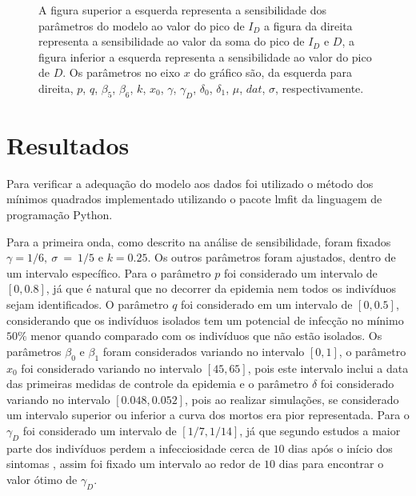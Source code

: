 \documentclass[12pt]{article}
\begin{document}
\begin{figure}[h!]
    
    
    
    
    \caption{A figura superior a esquerda representa a sensibilidade dos parâmetros do modelo ao valor do pico de $I_D$ a figura da direita representa a sensibilidade ao valor da soma do pico de $I_D$ e $D$, a figura inferior a esquerda representa a sensibilidade ao valor do pico de $D$. Os parâmetros no eixo $x$ do gráfico são, da esquerda para direita, $p$, $q$, $\beta_5$, $\beta_6$, $k$, $x_0$, $\gamma$, $\gamma_D$, $\delta_0$, $\delta_1$, $\mu$, $dat$, $\sigma$, respectivamente.}
    \label{sens2onda}
\end{figure}


\section{Resultados} 

Para verificar a adequação do modelo aos dados foi utilizado o método dos mínimos quadrados implementado utilizando o pacote lmfit \cite{LMFIT} da linguagem de programação Python. 

Para  a primeira onda, como descrito na análise de sensibilidade, foram fixados $\gamma = 1/6, \ \sigma~=~1/5$ e  $k=0.25$. Os outros parâmetros foram ajustados, dentro de um intervalo específico. Para o parâmetro $p$ foi considerado um intervalo de $[0,0.8]$, já que é natural que no decorrer da epidemia nem todos os indivíduos sejam identificados. O parâmetro $q$ foi considerado em um intervalo de $[0,0.5]$, considerando que os indivíduos isolados tem um potencial de infecção no mínimo $50\%$ menor quando comparado com os indivíduos que não estão isolados. Os parâmetros $\beta_0$ e $\beta_1$ foram considerados variando no intervalo $[0,1]$, o parâmetro $x_0$ foi considerado variando no intervalo $[45,65]$, pois este intervalo inclui a data das primeiras medidas de controle da epidemia e o parâmetro $\delta$ foi considerado variando no intervalo $[0.048, 0.052]$, pois ao realizar simulações, se considerado um intervalo superior ou inferior a curva dos mortos era pior representada. Para o $\gamma_D$ foi considerado um intervalo de $[1/7, 1/14]$, já que segundo estudos a maior parte dos indivíduos perdem a infecciosidade cerca de $10$ dias após o início dos sintomas  \cite{RKI2}, assim foi fixado um intervalo ao redor de $10$ dias para encontrar o valor ótimo de $\gamma_D$.
\end{document}
